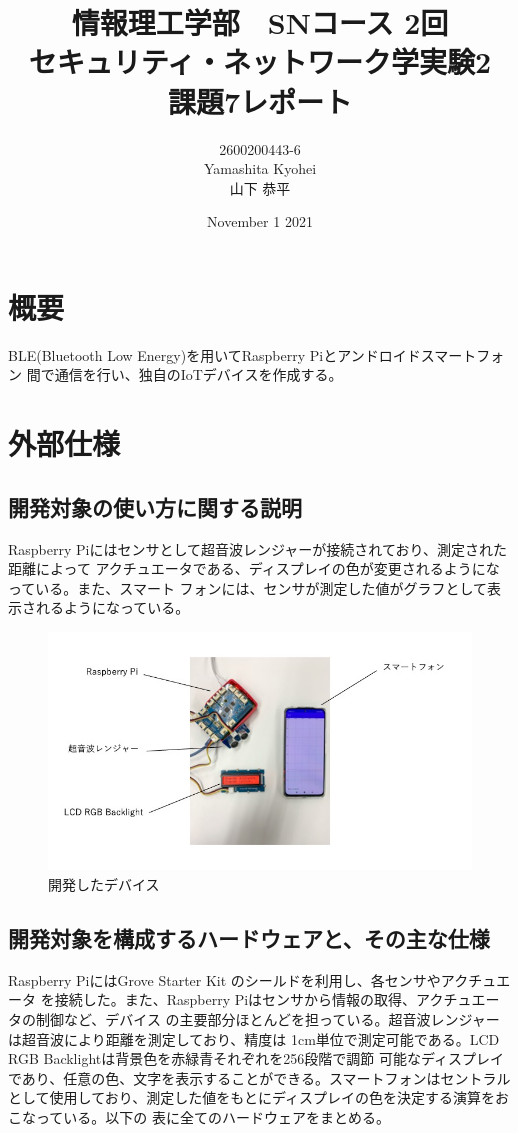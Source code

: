 \documentclass[dvipdfmx,autodetect-engine,titlepage]{jsarticle}
\title{情報理工学部　SNコース 2回\\
セキュリティ・ネットワーク学実験2\\
課題7レポート}
\author{2600200443-6\\Yamashita Kyohei\\山下 恭平}
\date{November 1 2021}
\begin{document}
\maketitle

\section{概要}
 BLE(Bluetooth Low Energy)を用いてRaspberry Piとアンドロイドスマートフォン
 間で通信を行い、独自のIoTデバイスを作成する。

\section{外部仕様}

 \subsection{開発対象の使い方に関する説明}
  Raspberry Piにはセンサとして超音波レンジャーが接続されており、測定された距離によって
  アクチュエータである、ディスプレイの色が変更されるようになっている。また、スマート
  フォンには、センサが測定した値がグラフとして表示されるようになっている。

 \begin{figure}[h]
    \centering
    \includegraphics[scale=0.5]{pic1.jpg}
    \caption{開発したデバイス}
  \end{figure}


 \subsection{開発対象を構成するハードウェアと、その主な仕様}
 Raspberry PiにはGrove Starter Kit のシールドを利用し、各センサやアクチュエータ
 を接続した。また、Raspberry Piはセンサから情報の取得、アクチュエータの制御など、デバイス
 の主要部分ほとんどを担っている。超音波レンジャーは超音波により距離を測定しており、精度は
 1cm単位で測定可能である。LCD RGB Backlightは背景色を赤緑青それぞれを256段階で調節
 可能なディスプレイであり、任意の色、文字を表示することができる。スマートフォンはセントラル
 として使用しており、測定した値をもとにディスプレイの色を決定する演算をおこなっている。以下の
 表に全てのハードウェアをまとめる。\\\\
\end{document}

